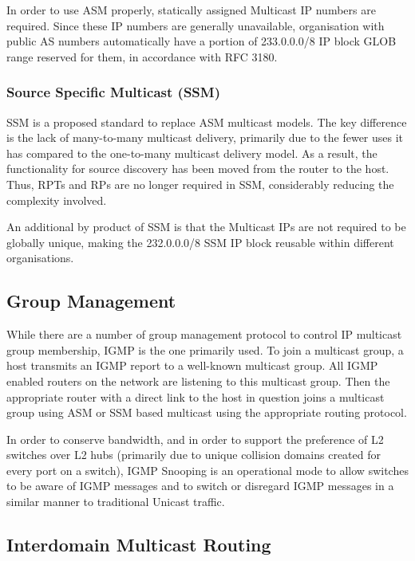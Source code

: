 In order to use ASM properly, statically assigned Multicast IP numbers
are required. Since these IP numbers are generally unavailable,
organisation with public AS numbers automatically have a portion of
233.0.0.0/8 IP block GLOB range reserved for them, in accordance with 
RFC 3180.

\subsubsection{Source Specific Multicast (SSM)}
\label{sec:ssm}

SSM is a proposed standard to replace ASM multicast models. The key
difference is the lack of many-to-many multicast delivery, primarily due
to the fewer uses it has compared to the one-to-many multicast delivery
model. As a result, the functionality for source discovery has been
moved from the router to the host. Thus, RPTs and RPs are no longer
required in SSM, considerably reducing the complexity involved.


An additional by product of SSM is that the Multicast IPs are not 
required to be globally unique, making the 232.0.0.0/8 SSM IP block
reusable within different organisations.

\subsection{Group Management}

While there are a number of group management protocol to control IP
multicast group membership, IGMP is the one primarily used. To join a
multicast group, a host transmits an IGMP report to a well-known
multicast group. All IGMP enabled routers on the network are listening to
this multicast group. Then the appropriate router with a direct link to
the host in question joins a multicast group using ASM or SSM based
multicast using the appropriate routing protocol.


In order to conserve bandwidth, and in order to support the preference
of L2 switches over L2 hubs (primarily due to unique collision domains
created for every port on a switch), IGMP Snooping is an operational
mode to allow switches to be aware of IGMP messages and to switch or
disregard IGMP messages in a similar manner to traditional Unicast
traffic.

\subsection{Interdomain Multicast Routing}

